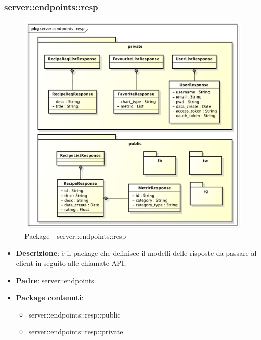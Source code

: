 \subsubsection{server::endpoints::resp} %
\label{ssub:bdsm_app_server_endpoints_resp}
\begin{figure}[!htbp]
  \centering
  \centerline{\includegraphics[scale=0.45]{./images/server/resp.pdf}}
  \caption{Package - server::endpoints::resp}
\end{figure}

\begin{itemize}
  \item \textbf{Descrizione}: è il package che definisce il modelli delle risposte da passare al client in seguito alle chiamate API;
  \item \textbf{Padre}: server::endpoints
  \item \textbf{Package contenuti}:
    \begin{itemize}
      \item server::endpoints::resp::public
      \item server::endpoints::resp::private
  \end{itemize}
\end{itemize}

